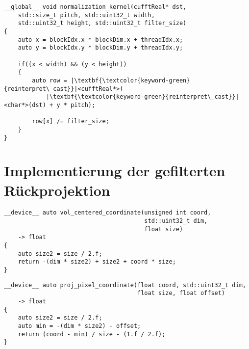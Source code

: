 \begin{code}
\begin{verbatim}
__global__ void normalization_kernel(cufftReal* dst,
    std::size_t pitch, std::uint32_t width,
    std::uint32_t height, std::uint32_t filter_size)
{
    auto x = blockIdx.x * blockDim.x + threadIdx.x;
    auto y = blockIdx.y * blockDim.y + threadIdx.y;

    if((x < width) && (y < height))
    {
        auto row = |\textbf{\textcolor{keyword-green}{reinterpret\_cast}}|<cufftReal*>(
            |\textbf{\textcolor{keyword-green}{reinterpret\_cast}}|<char*>(dst) + y * pitch);

        row[x] /= filter_size;
    }
}
\end{verbatim}
\label{app:filter_norm}
\end{code}

\section{Implementierung der gefilterten Rückprojektion}

\begin{code}
\begin{verbatim}
__device__ auto vol_centered_coordinate(unsigned int coord,
                                        std::uint32_t dim,
                                        float size)
    -> float
{
    auto size2 = size / 2.f;
    return -(dim * size2) + size2 + coord * size;
}
\end{verbatim}
\label{app:coord_vol}
\end{code}

\begin{code}
\begin{verbatim}
__device__ auto proj_pixel_coordinate(float coord, std::uint32_t dim,
                                      float size, float offset)
    -> float
{
    auto size2 = size / 2.f;
    auto min = -(dim * size2) - offset;
    return (coord - min) / size - (1.f / 2.f);
}
\end{verbatim}
\label{app:coord_det}
\end{code}

